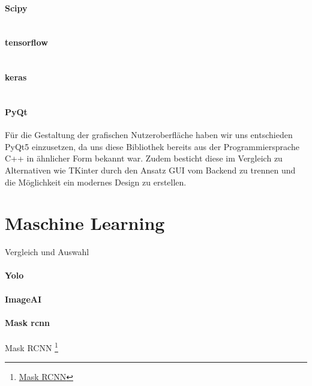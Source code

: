 \paragraph{Scipy}$~$\\
\paragraph{tensorflow}$~$\\
\paragraph{keras}$~$\\
\paragraph{PyQt} $~$\\
Für die Gestaltung der grafischen Nutzeroberfläche haben wir uns entschieden PyQt5 einzusetzen, da uns diese Bibliothek bereits aus der Programmiersprache C++ in ähnlicher Form bekannt war. Zudem besticht diese im Vergleich zu Alternativen wie TKinter durch den Ansatz GUI vom Backend zu trennen und die Möglichkeit ein modernes Design zu erstellen.
	
	
\section{Maschine Learning}
Vergleich und Auswahl
\paragraph{Yolo}
\paragraph{ImageAI}
\paragraph{Mask rcnn}
Mask RCNN \footnote{\href{https://github.com/matterport/Mask_RCNN}{Mask RCNN}}


